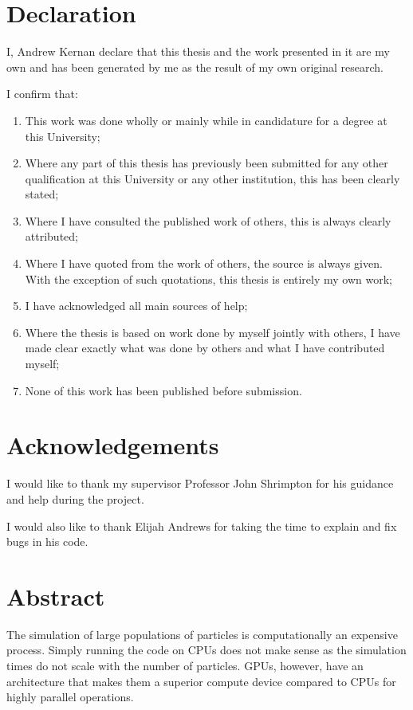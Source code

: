 \documentclass[a4paper, 11pt]{article}
\numberwithin{equation}{section}
\numberwithin{figure}{section}
\numberwithin{table}{section}
\begin{document}


\hypertarget{dec}{\section*{Declaration}\label{dec}}
I, Andrew Kernan declare that this thesis and the work presented in it are my own and has been generated by me as the result of my own original research.

I confirm that:
\begin{enumerate}
	\item This work was done wholly or mainly while in candidature for a degree at this University;
	\item Where any part of this thesis has previously been submitted for any other qualification at this University or any other institution, this has been clearly stated;
	\item Where I have consulted the published work of others, this is always clearly attributed;
	\item Where I have quoted from the work of others, the source is always given. With the exception of such quotations, this thesis is entirely my own work;
	\item I have acknowledged all main sources of help;
	\item Where the thesis is based on work done by myself jointly with others, I have made clear exactly what was done by others and what I have contributed myself;
	\item None of this work has been published before submission.
\end{enumerate}

\newpage

\hypertarget{ack}{\section*{Acknowledgements}\label{ack}}
I would like to thank my supervisor Professor John Shrimpton for his guidance and help during the project.

I would also like to thank Elijah Andrews for taking the time to explain and fix bugs in his code.

\newpage

{
	\setcounter{tocdepth}{3}
	\tableofcontents
}

\newpage

\hypertarget{abs}{\section*{Abstract}\label{abs}}
The simulation of large populations of particles is computationally an expensive process. Simply running the code on CPUs does not make sense as the simulation times do not scale with the number of particles. GPUs, however, have an architecture that makes them a superior compute device compared to CPUs for highly parallel operations.
\end{document}
